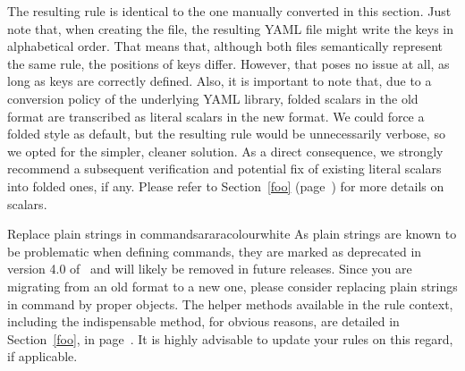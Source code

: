 
The resulting rule is identical to the one manually converted in this section. Just note that, when creating the file, the resulting YAML file might write the keys in alphabetical order. That means that, although both files semantically represent the same rule, the positions of keys differ. However, that poses no issue at all, as long as keys are correctly defined. Also, it is important to note that, due to a conversion policy of the underlying YAML library, folded scalars in the old format are transcribed as literal scalars in the new format. We could force a folded style as default, but the resulting rule would be unnecessarily verbose, so we opted for the simpler, cleaner solution. As a direct consequence, we strongly recommend a subsequent verification and potential fix of existing literal scalars into folded ones, if any. Please refer to Section~\ref{foo} (page~\pageref{foo}) for more details on scalars.

\begin{messagebox}{Replace plain strings in commands}{araracolour}{\icattention}{white}
As plain strings are known to be problematic when defining commands, they are marked as deprecated in version 4.0 of \arara\ and will likely be removed in future releases. Since you are migrating from an old format to a new one, please consider replacing plain strings in command by proper  objects. The helper methods available in the rule context, including the indispensable  method, for obvious reasons, are detailed in Section~\ref{foo}, in page~\pageref{foo}. It is highly advisable to update your rules on this regard, if applicable.
\end{messagebox}

